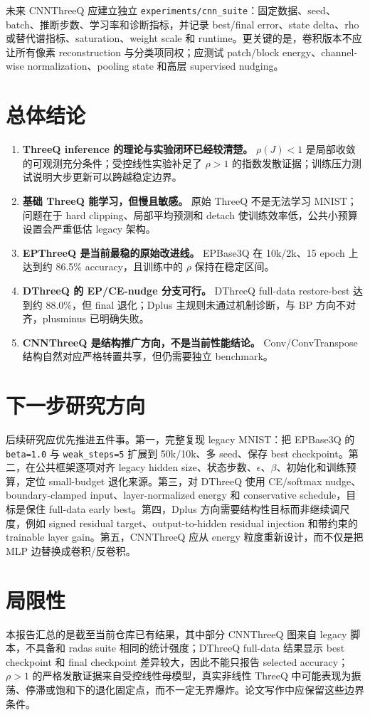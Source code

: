 \documentclass[UTF8,zihao=-4]{ctexart}
\begin{document}
        未来 CNNThreeQ 应建立独立 \texttt{experiments/cnn\_suite}：固定数据、seed、batch、推断步数、学习率和诊断指标，并记录 best/final error、state delta、rho 或替代谱指标、saturation、weight scale 和 runtime。更关键的是，卷积版本不应让所有像素 reconstruction 与分类项同权；应测试 patch/block energy、channel-wise normalization、pooling state 和高层 supervised nudging。

        \section{总体结论}

        \begin{enumerate}[leftmargin=2em]
        \item \textbf{ThreeQ inference 的理论与实验闭环已经较清楚。} $\rho(J)<1$ 是局部收敛的可观测充分条件；受控线性实验补足了 $\rho>1$ 的指数发散证据；训练压力测试说明大步更新可以跨越稳定边界。
        \item \textbf{基础 ThreeQ 能学习，但慢且敏感。} 原始 ThreeQ 不是无法学习 MNIST；问题在于 hard clipping、局部平均预测和 detach 使训练效率低，公共小预算设置会严重低估 legacy 架构。
        \item \textbf{EPThreeQ 是当前最稳的原始改进线。} EPBase3Q 在 10k/2k、15 epoch 上达到约 86.5\% accuracy，且训练中的 $\rho$ 保持在稳定区间。
        \item \textbf{DThreeQ 的 EP/CE-nudge 分支可行。} DThreeQ full-data restore-best 达到约 88.0\%，但 final 退化；Dplus 主规则未通过机制诊断，与 BP 方向不对齐，plusminus 已明确失败。
        \item \textbf{CNNThreeQ 是结构推广方向，不是当前性能结论。} Conv/ConvTranspose 结构自然对应严格转置共享，但仍需要独立 benchmark。
        \end{enumerate}

        \section{下一步研究方向}

        后续研究应优先推进五件事。第一，完整复现 legacy MNIST：把 EPBase3Q 的 \texttt{beta=1.0} 与 \texttt{weak\_steps=5} 扩展到 50k/10k、多 seed、保存 best checkpoint。第二，在公共框架逐项对齐 legacy hidden size、状态步数、$\epsilon$、$\beta$、初始化和训练预算，定位 small-budget 退化来源。第三，对 DThreeQ 使用 CE/softmax nudge、boundary-clamped input、layer-normalized energy 和 conservative schedule，目标是保住 full-data early best。第四，Dplus 方向需要结构性目标而非继续调尺度，例如 signed residual target、output-to-hidden residual injection 和带约束的 trainable layer gain。第五，CNNThreeQ 应从 energy 粒度重新设计，而不仅是把 MLP 边替换成卷积/反卷积。

        \section{局限性}

        本报告汇总的是截至当前仓库已有结果，其中部分 CNNThreeQ 图来自 legacy 脚本，不具备和 radas suite 相同的统计强度；DThreeQ full-data 结果显示 best checkpoint 和 final checkpoint 差异较大，因此不能只报告 selected accuracy；$\rho>1$ 的严格发散证据来自受控线性母模型，真实非线性 ThreeQ 中可能表现为振荡、停滞或饱和下的退化固定点，而不一定无界爆炸。论文写作中应保留这些边界条件。

        
\end{document}
